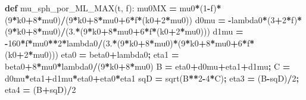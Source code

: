 \documentclass[
  a4paper,
  numbers=noendperiod,
  DIV=12]{scrreprt}
\newenvironment{Shaded}{\begin{snugshade}}{\end{snugshade}}
\newcommand{\DecValTok}[1]{\textcolor[rgb]{0.00,0.00,0.81}{#1}}
\newcommand{\FloatTok}[1]{\textcolor[rgb]{0.00,0.00,0.81}{#1}}
\newcommand{\KeywordTok}[1]{\textcolor[rgb]{0.13,0.29,0.53}{\textbf{#1}}}
\newcommand{\NormalTok}[1]{#1}
\newcommand{\OperatorTok}[1]{\textcolor[rgb]{0.81,0.36,0.00}{\textbf{#1}}}
\begin{document}
\begin{Shaded}
\begin{Highlighting}[]
\KeywordTok{def}\NormalTok{ mu\_sph\_por\_ML\_MAX(t, f):}
\NormalTok{    mu0MX }\OperatorTok{=}\NormalTok{ mu0}\OperatorTok{*}\NormalTok{(}\DecValTok{1}\OperatorTok{{-}}\NormalTok{f)}\OperatorTok{*}\NormalTok{(}\DecValTok{9}\OperatorTok{*}\NormalTok{k0}\OperatorTok{+}\DecValTok{8}\OperatorTok{*}\NormalTok{mu0)}\OperatorTok{/}\NormalTok{(}\DecValTok{9}\OperatorTok{*}\NormalTok{k0}\OperatorTok{+}\DecValTok{8}\OperatorTok{*}\NormalTok{mu0}\OperatorTok{+}\DecValTok{6}\OperatorTok{*}\NormalTok{f}\OperatorTok{*}\NormalTok{(k0}\OperatorTok{+}\DecValTok{2}\OperatorTok{*}\NormalTok{mu0))}
\NormalTok{    d0mu  }\OperatorTok{=} \OperatorTok{{-}}\NormalTok{lambda0}\OperatorTok{*}\NormalTok{(}\DecValTok{3}\OperatorTok{+}\DecValTok{2}\OperatorTok{*}\NormalTok{f)}\OperatorTok{*}\NormalTok{(}\DecValTok{9}\OperatorTok{*}\NormalTok{k0}\OperatorTok{+}\DecValTok{8}\OperatorTok{*}\NormalTok{mu0)}\OperatorTok{/}\NormalTok{(}\FloatTok{3.}\OperatorTok{*}\NormalTok{(}\DecValTok{9}\OperatorTok{*}\NormalTok{k0}\OperatorTok{+}\DecValTok{8}\OperatorTok{*}\NormalTok{mu0}\OperatorTok{+}\DecValTok{6}\OperatorTok{*}\NormalTok{f}\OperatorTok{*}\NormalTok{(k0}\OperatorTok{+}\DecValTok{2}\OperatorTok{*}\NormalTok{mu0)))}
\NormalTok{    d1mu  }\OperatorTok{=} \OperatorTok{{-}}\DecValTok{160}\OperatorTok{*}\NormalTok{f}\OperatorTok{*}\NormalTok{mu0}\OperatorTok{**}\DecValTok{2}\OperatorTok{*}\NormalTok{lambda0}\OperatorTok{/}\NormalTok{(}\FloatTok{3.}\OperatorTok{*}\NormalTok{(}\DecValTok{9}\OperatorTok{*}\NormalTok{k0}\OperatorTok{+}\DecValTok{8}\OperatorTok{*}\NormalTok{mu0)}\OperatorTok{*}\NormalTok{(}\DecValTok{9}\OperatorTok{*}\NormalTok{k0}\OperatorTok{+}\DecValTok{8}\OperatorTok{*}\NormalTok{mu0}\OperatorTok{+}\DecValTok{6}\OperatorTok{*}\NormalTok{f}\OperatorTok{*}\NormalTok{(k0}\OperatorTok{+}\DecValTok{2}\OperatorTok{*}\NormalTok{mu0)))}
\NormalTok{    eta0 }\OperatorTok{=}\NormalTok{ beta0}\OperatorTok{+}\NormalTok{lambda0}\OperatorTok{;}\NormalTok{  eta1 }\OperatorTok{=}\NormalTok{ beta0}\OperatorTok{+}\DecValTok{8}\OperatorTok{*}\NormalTok{mu0}\OperatorTok{*}\NormalTok{lambda0}\OperatorTok{/}\NormalTok{(}\DecValTok{9}\OperatorTok{*}\NormalTok{k0}\OperatorTok{+}\DecValTok{8}\OperatorTok{*}\NormalTok{mu0)}
\NormalTok{    B }\OperatorTok{=}\NormalTok{ eta0}\OperatorTok{+}\NormalTok{d0mu}\OperatorTok{+}\NormalTok{eta1}\OperatorTok{+}\NormalTok{d1mu}\OperatorTok{;}\NormalTok{  C }\OperatorTok{=}\NormalTok{ d0mu}\OperatorTok{*}\NormalTok{eta1}\OperatorTok{+}\NormalTok{d1mu}\OperatorTok{*}\NormalTok{eta0}\OperatorTok{+}\NormalTok{eta0}\OperatorTok{*}\NormalTok{eta1}
\NormalTok{    sqD }\OperatorTok{=}\NormalTok{ sqrt(B}\OperatorTok{**}\DecValTok{2}\OperatorTok{{-}}\DecValTok{4}\OperatorTok{*}\NormalTok{C)}\OperatorTok{;}\NormalTok{  eta3 }\OperatorTok{=}\NormalTok{ (B}\OperatorTok{{-}}\NormalTok{sqD)}\OperatorTok{/}\DecValTok{2}\OperatorTok{;}\NormalTok{  eta4 }\OperatorTok{=}\NormalTok{ (B}\OperatorTok{+}\NormalTok{sqD)}\OperatorTok{/}\DecValTok{2}

\end{Highlighting}
\end{Shaded}
\end{document}
